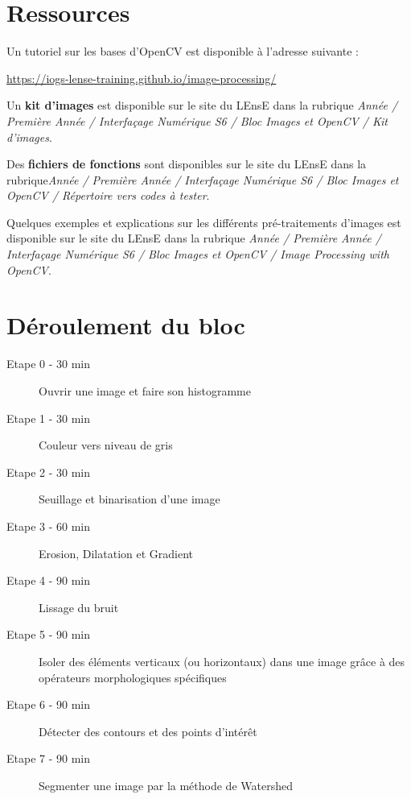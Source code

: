 \documentclass[a4paper,11pt,titlepage]{article} %
\begin{document}

\section{Ressources}

Un tutoriel sur les bases d'OpenCV est disponible à l’adresse suivante : 

\href{https://iogs-lense-training.github.io/image-processing/}{https://iogs-lense-training.github.io/image-processing/}

Un \textbf{kit d'images} est disponible sur le site du LEnsE dans la rubrique \textit{Année / Première Année / Interfaçage Numérique S6 / Bloc Images et OpenCV / Kit d'images}. 

Des \textbf{fichiers de fonctions} sont disponibles sur le site du LEnsE dans la rubrique\textit{Année / Première Année / Interfaçage Numérique S6 / Bloc Images et OpenCV / Répertoire vers codes à tester}. 


Quelques exemples et explications sur les différents pré-traitements d'images est disponible sur le site du LEnsE dans la rubrique \textit{Année / Première Année / Interfaçage Numérique S6 / Bloc Images et OpenCV / Image Processing with OpenCV}. 


\section{Déroulement du bloc}

\begin{description}
	\item[Etape 0 - 30 min] Ouvrir une image et faire son histogramme
	\item[Etape 1 - 30 min] Couleur vers niveau de gris
	\item[Etape 2 - 30 min] Seuillage et binarisation d'une image
	\item[Etape 3 - 60 min] Erosion, Dilatation et Gradient
	\item[Etape 4 - 90 min] Lissage du bruit
	\item[Etape 5 - 90 min] Isoler des éléments verticaux (ou horizontaux) dans une image grâce à des opérateurs morphologiques spécifiques
	\item[Etape 6 - 90 min] Détecter des contours et des points d'intérêt
	\item[Etape 7 - 90 min] Segmenter une image par la méthode de Watershed
	
\end{description}
	
\end{document}

